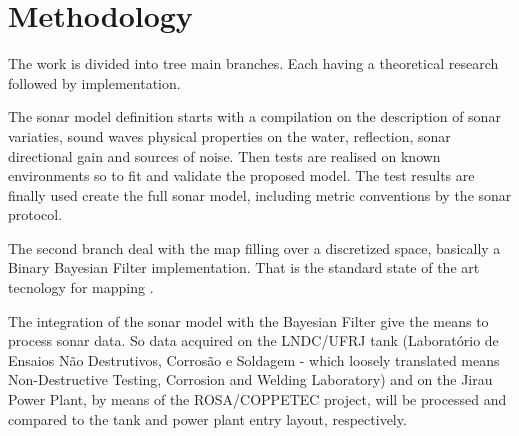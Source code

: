 

\section{Methodology}
 


% 


The work is divided into tree main branches. Each having a theoretical research
followed by implementation.

The sonar model definition starts with a compilation on the description of sonar
variaties, sound waves physical properties on the water, reflection, sonar
directional gain and sources of noise. Then tests are realised on known
environments so to fit and validate the proposed model. The test results are
finally used create the full sonar model, including metric conventions by the
sonar protocol.

The second branch deal with the map filling over a discretized space, basically
a Binary Bayesian Filter implementation. That is the standard state of the art
tecnology for mapping \cite{thrunprob}.



The integration of the sonar model with the Bayesian Filter give the means to
process sonar data. So data acquired on the LNDC/UFRJ tank (Laboratório de
Ensaios Não Destrutivos, Corrosão e Soldagem - which loosely translated means
Non-Destructive Testing, Corrosion and Welding Laboratory) and on the Jirau
Power Plant, by means of the ROSA/COPPETEC project, will be processed and
compared to the tank and power plant entry layout, respectively.
 
